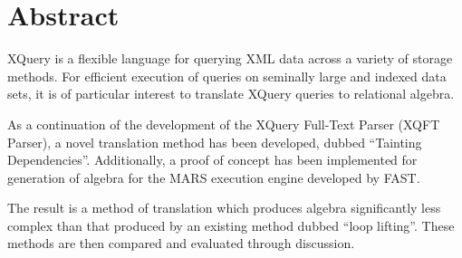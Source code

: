 \chapter*{Abstract}
XQuery is a flexible language for querying XML data across a variety of storage
methods. For efficient execution of queries on seminally large and indexed data
sets, it is of particular interest to translate XQuery queries to relational
algebra.

As a continuation of the development of the XQuery Full-Text Parser (XQFT
Parser)\cite{ourselves}, a novel translation method has been developed, dubbed
``Tainting Dependencies''. Additionally, a proof of concept has been
implemented for generation of algebra for the MARS execution engine developed
by FAST.

The result is a method of translation which produces algebra significantly less
complex than that produced by an existing method dubbed ``loop lifting''. These
methods are then compared and evaluated through discussion.
